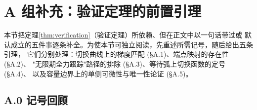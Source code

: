 
\section*{A 组补充：验证定理的前置引理}

本节把定理\ref{thm:verification}（验证定理）所依赖、但在正文中以一句话带过或
默认成立的五件事逐条补全。为使本节可独立阅读，先重述所需记号，随后给出五条引理，
它们分别处理：切换曲线上的梯度匹配 (\S A.1)、端点映射的存在性 (\S A.2)、
"无限期全力跟踪"路径的排除 (\S A.3)、等待弧上切换函数的定号 (\S A.4)、
以及容量边界上的单侧可微性与唯一性论证 (\S A.5)。

\subsection*{A.0 记号回顾}

